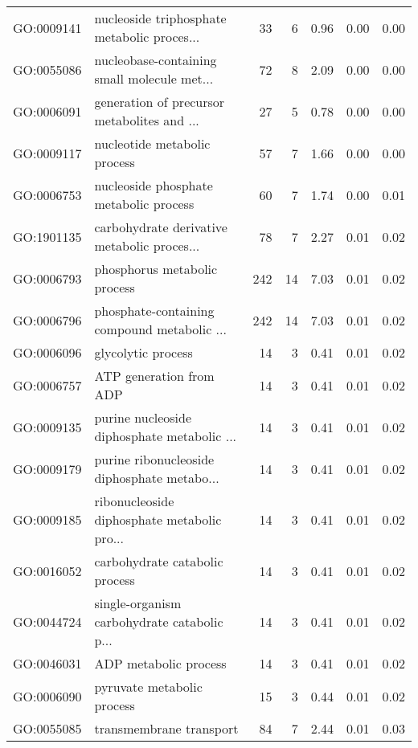 \begin{table}[ht]
\begin{tabular}{llrrrrr}
  GO:0009141 & nucleoside triphosphate metabolic proces... &  33 &   6 & 0.96 & 0.00 & 0.00 \\ 
  GO:0055086 & nucleobase-containing small molecule met... &  72 &   8 & 2.09 & 0.00 & 0.00 \\ 
  GO:0006091 & generation of precursor metabolites and ... &  27 &   5 & 0.78 & 0.00 & 0.00 \\ 
  GO:0009117 & nucleotide metabolic process &  57 &   7 & 1.66 & 0.00 & 0.00 \\ 
  GO:0006753 & nucleoside phosphate metabolic process &  60 &   7 & 1.74 & 0.00 & 0.01 \\ 
  GO:1901135 & carbohydrate derivative metabolic proces... &  78 &   7 & 2.27 & 0.01 & 0.02 \\ 
  GO:0006793 & phosphorus metabolic process & 242 &  14 & 7.03 & 0.01 & 0.02 \\ 
  GO:0006796 & phosphate-containing compound metabolic ... & 242 &  14 & 7.03 & 0.01 & 0.02 \\ 
  GO:0006096 & glycolytic process &  14 &   3 & 0.41 & 0.01 & 0.02 \\ 
  GO:0006757 & ATP generation from ADP &  14 &   3 & 0.41 & 0.01 & 0.02 \\ 
  GO:0009135 & purine nucleoside diphosphate metabolic ... &  14 &   3 & 0.41 & 0.01 & 0.02 \\ 
  GO:0009179 & purine ribonucleoside diphosphate metabo... &  14 &   3 & 0.41 & 0.01 & 0.02 \\ 
  GO:0009185 & ribonucleoside diphosphate metabolic pro... &  14 &   3 & 0.41 & 0.01 & 0.02 \\ 
  GO:0016052 & carbohydrate catabolic process &  14 &   3 & 0.41 & 0.01 & 0.02 \\ 
  GO:0044724 & single-organism carbohydrate catabolic p... &  14 &   3 & 0.41 & 0.01 & 0.02 \\ 
  GO:0046031 & ADP metabolic process &  14 &   3 & 0.41 & 0.01 & 0.02 \\ 
  GO:0006090 & pyruvate metabolic process &  15 &   3 & 0.44 & 0.01 & 0.02 \\ 
  GO:0055085 & transmembrane transport &  84 &   7 & 2.44 & 0.01 & 0.03 \\ 
   \hline
\end{tabular}
\end{table}

